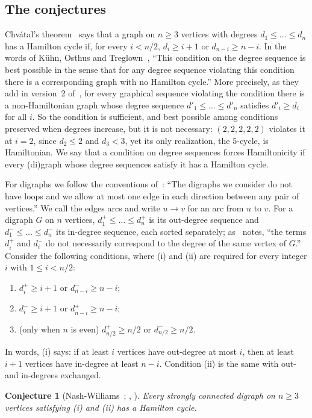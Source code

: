 \documentclass[11pt]{article}
\newtheorem{conjecture}{Conjecture}
\begin{document}
\subsection{The conjectures}
Chvátal's theorem~\cite{Ch} says that a graph on $n\ge3$ vertices with degrees $d_1\le\dots\le d_n$ has a Hamilton cycle if, for every $i<n/2$, $d_i\ge i+1$ or $d_{n-i}\ge n-i$. In the words of Kühn, Osthus and Treglown~\cite{KOT}, ``This condition on the degree sequence is best possible in the sense that for any degree sequence violating this condition there is a corresponding graph with no Hamilton cycle.'' More precisely, as they add in version~2 of~\cite{KOT}, for every graphical sequence violating the condition there is a non-Hamiltonian graph whose degree sequence $d'_1\le\dots\le d'_n$ satisfies $d'_i\ge d_i$ for all $i$. So the condition is sufficient, and best possible among conditions preserved when degrees increase, but it is not necessary: $(2,2,2,2,2)$ violates it at $i=2$, since $d_2\le2$ and $d_3<3$, yet its only realization, the $5$-cycle, is Hamiltonian. We say that a condition on degree sequences forces Hamiltonicity if every (di)graph whose degree sequences satisfy it has a Hamilton cycle.

For digraphs we follow the conventions of~\cite{KOT}: ``The digraphs we consider do not have loops and we allow at most one edge in each direction between any pair of vertices.'' We call the edges arcs and write $u\to v$ for an arc from $u$ to $v$. For a digraph $G$ on $n$ vertices, $d^+_1\le\dots\le d^+_n$ is its out-degree sequence and $d^-_1\le\dots\le d^-_n$ its in-degree sequence, each sorted separately; as~\cite{KOT} notes, ``the terms $d^+_i$ and $d^-_i$ do not necessarily correspond to the degree of the same vertex of $G$.'' Consider the following conditions, where (i) and (ii) are required for every integer $i$ with $1\le i<n/2$:
\begin{enumerate}
\item[(i)] $d^+_i\ge i+1$ or $d^-_{n-i}\ge n-i$;
\item[(ii)] $d^-_i\ge i+1$ or $d^+_{n-i}\ge n-i$;
\item[(iii)] (only when $n$ is even) $d^+_{n/2}\ge n/2$ or $d^-_{n/2}\ge n/2$.
\end{enumerate}
In words, (i) says: if at least $i$ vertices have out-degree at most $i$, then at least $i+1$ vertices have in-degree at least $n-i$. Condition (ii) is the same with out- and in-degrees exchanged.

\begin{conjecture}[Nash-Williams~\cite{NW75}; {\cite[Conjecture 1]{KOT}}, {\cite[Conjecture 6]{KO}}]\label{conj:NW}
Every strongly connected digraph on $n\ge3$ vertices satisfying (i) and (ii) has a Hamilton cycle.
\end{conjecture}
\end{document}
